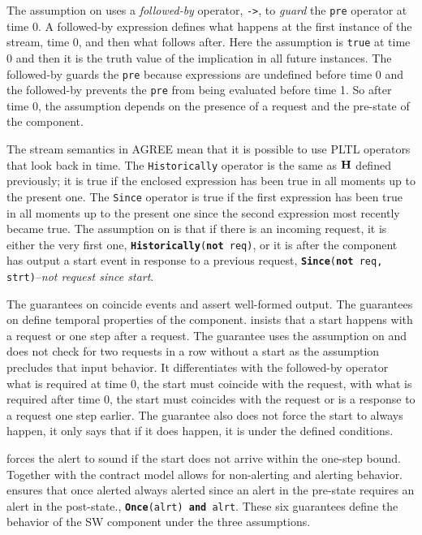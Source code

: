 The assumption on  uses a \emph{followed-by} operator, \texttt{->}, to \emph{guard} the \texttt{pre} operator at time 0.
A followed-by expression defines what happens at the first instance of the stream, time 0, and then what follows after. 
Here the assumption is \texttt{true} at time 0 and then it is the truth value of the implication in all future instances.
The followed-by guards the \texttt{pre} because expressions are undefined before time 0 and the followed-by prevents the \texttt{pre} from being evaluated before time 1.
So after time 0, the assumption depends on the presence of a request and the pre-state of the component.

The stream semantics in AGREE mean that it is possible to use PLTL operators that look back in time.
The \texttt{Historically} operator is the same as $\mathbf{H}$ defined previously; it is true if the enclosed expression has been true in all moments up to the present one. 
The \texttt{Since} operator is true if the first expression has been true in all moments up to the present one since the second expression most recently became true.
The assumption on  is that if there is an incoming request, it is either the very first one, \texttt{\textbf{Historically}(\textbf{not} req)}, or it is after the component has output a start event in response to a previous request, \texttt{\textbf{Since}(\textbf{not} req, strt)}--\emph{not request since start}.

The guarantees on  coincide events and assert well-formed output.
The guarantees on  define temporal properties of the component.
 insists that a start happens with a request or one step after a request.
The guarantee uses the assumption on  and does not check for two requests in a row without a start as the assumption precludes that input behavior.
It differentiates with the followed-by operator what is required at time 0, the start must coincide with the request, with what is required after time 0, the start must coincides with the request or is a response to a request one step earlier.
The guarantee also does not force the start to always happen, it only says that if it does happen, it is under the defined conditions.

 forces the alert to sound if the start does not arrive within the one-step bound.
Together with  the contract model allows for non-alerting and alerting behavior.
 ensures that once alerted always alerted since an alert in the pre-state requires an alert in the post-state., \texttt{\textbf{Once}(alrt) \textbf{and} alrt}.
These six guarantees define the behavior of the SW component under the three assumptions.
